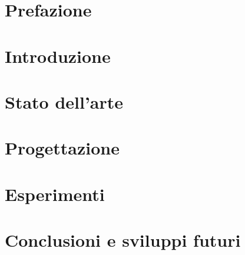 \documentclass[final,a4paper]{book}
\begin{document}


\chapter*{Prefazione}



\clearpage

\chapter {Introduzione}\label{chap:chap_1}


\chapter {Stato dell'arte}\label{chap:chap_2}


\chapter {Progettazione}\label{chap:chap_3}


\chapter {Esperimenti}\label{chap:chap_4}


\chapter*{Conclusioni e sviluppi futuri}






%
\clearpage
\vspace*{6cm}

\end{document}
